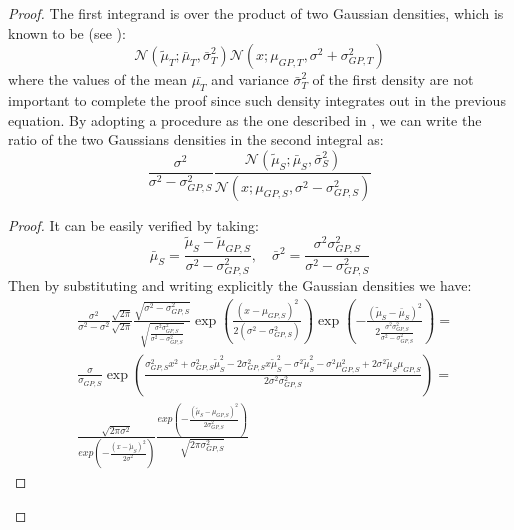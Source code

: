 \begin{proof}
      \noindent The first integrand is over the product of two Gaussian densities, which is known to be (see \cite{bromiley2003products}):
      \begin{equation}
        \mathcal{N}(\tilde{\mu}_{T}; \bar{\mu}_{T}, \bar{\sigma}^{2}_{T}) \mathcal{N} (x; \mu_{GP,T}, \sigma^{2}+\sigma_{GP,T}^{2})
      \end{equation}
      where the values of the mean $\bar{\mu_{T}}$ and variance $\bar{\sigma}^{2}_{T}$ of the first density are not important
      to complete the proof since such density integrates out in the previous equation. By adopting a  procedure as the
      one described in \cite{bromiley2003products}, we can write the ratio of the two Gaussians densities in the second integral
      as:
      \begin{equation}
        \frac{\sigma^{2}}{\sigma^{2}-\sigma^{2}_{GP,S}} \frac{\mathcal{N}(\tilde{\mu}_{S}; \bar{\mu}_{S}, \bar{\sigma}^{2}_{S})}{\mathcal{N}(x; \mu_{GP,S}, \sigma^{2}-\sigma^{2}_{GP,S})}
      \end{equation}
      \begin{proof}
        It can be easily verified by taking:
        \begin{equation}
          \bar{\mu}_{S} = \frac{\tilde{\mu}_{S} - \tilde{\mu}_{GP,S}}{\sigma^{2} - \sigma^{2}_{GP,S}}, \quad \bar{\sigma}^{2} = \frac{\sigma^{2}\sigma^{2}_{GP,S}}{\sigma^{2}-\sigma_{GP,S}^{2}}
        \end{equation}
        Then by substituting and writing explicitly the Gaussian densities we have:
        \begin{equation*}
          \begin{aligned}
            & \frac{\sigma^2}{\sigma^{2}-\sigma^{2}}\frac{\sqrt{2\pi}}{\sqrt{2\pi}}\frac{\sqrt{\sigma^{2}-\sigma_{GP,S}^{2}}} {\sqrt{\frac{\sigma^{2}\sigma^{2}_{GP,S}}{\sigma^{2}-\sigma^{2}_{GP,S}} }} \exp \left ( \frac{(x-\mu_{GP,S})^{2}}{2(\sigma^{2}-\sigma^{2}_{GP,S})} \right )
              \exp \left ( -\frac{(\tilde{\mu}_{S} - \bar{\mu}_{S})^{2}}{2 \frac{\sigma^{2}\sigma^{2}_{GP,S}}{\sigma^{2}-\sigma^{2}_{GP,S}}} \right ) = \\
            & \frac{\sigma}{\sigma_{GP,S}} \exp \left ( \frac{\sigma^{2}_{GP,S}x^{2} + \sigma^{2}_{GP,S}\tilde{\mu}^{2}_{S} - 2\sigma^{2}_{GP,S}x\tilde{\mu}_{S}^{2} - \sigma^{2}\tilde{\mu}^{2}_{S} - \sigma^{2}\mu_{GP,S}^{2} + 2\sigma^{2}\tilde{\mu}_{S} \mu_{GP,S}}{2\sigma^{2}\sigma^{2}_{GP,S}} \right ) = \\
            & \frac{\sqrt{2\pi\sigma^{2}}}{exp \left ( -\frac{(x-\tilde{\mu}_{S})^{2}}{2\sigma^{2}} \right )} \frac{exp \left ( -\frac{(\tilde{\mu}_{S}-\mu_{GP,S})^{2}}{2\sigma^{2}_{GP,S}} \right )}{\sqrt{2\pi\sigma^{2}_{GP,S}}}

\end{aligned}
\end{equation*}
\end{proof}
\end{proof}
